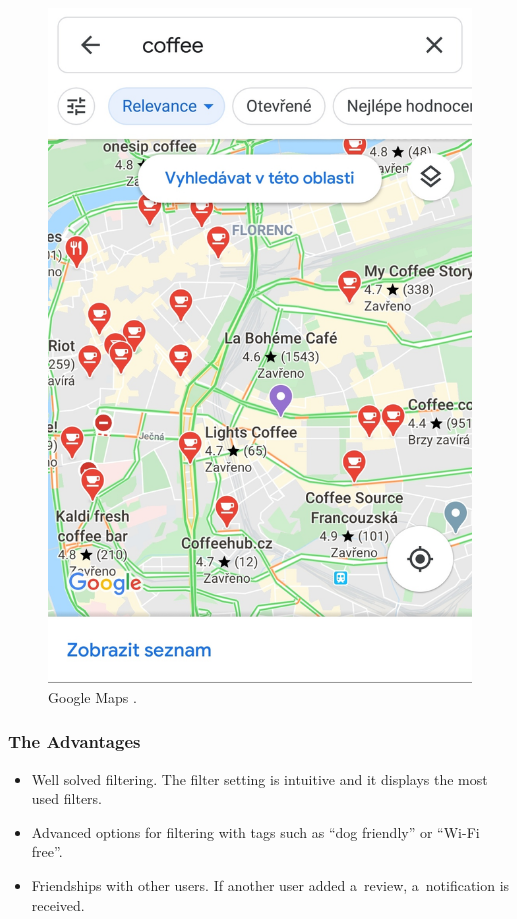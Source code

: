 \begin{figure}[ht]
\begin{minipage}{0.45\linewidth}
        \includegraphics[width=0.75\linewidth]{img/analysis/app-gmaps.jpg}
        \caption{Google Maps \cite{app-google-maps}.}
        \label{fig:google-maps}
    \end{minipage}
\end{figure}

\subsubsection{The Advantages}
\begin{itemize}
    \item Well solved filtering. The filter setting is intuitive and it displays the most used filters. 
    \item Advanced options for filtering with tags such as ``dog friendly'' or ``Wi-Fi free''.
    \item Friendships with other users. If another user added a~review, a~notification is received.
\end{itemize}

